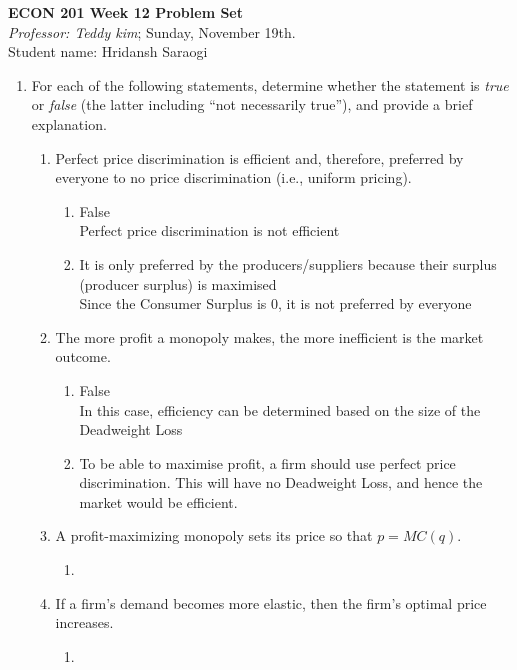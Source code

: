 \documentclass[11pt]{article}
\begin{document}
\begin{center}
\textbf{ECON 201 Week 12 Problem Set}\\
\textit {Professor: Teddy kim};  
Sunday, November 19th.
\\Student name: Hridansh Saraogi
\end{center}

\begin{enumerate}
\item For each of the following statements, determine whether
the statement is \emph{true} or \emph{false} (the latter including ``not necessarily true''), and provide a brief explanation.
    \begin{enumerate}
    \item Perfect price discrimination is efficient and, therefore, preferred by everyone to no price discrimination (i.e., uniform pricing).
    \begin{enumerate}
        \item False\\
        Perfect price discrimination is not efficient
        \item It is only preferred by the producers/suppliers because their surplus (producer surplus) is maximised\\Since the Consumer Surplus is 0, it is not preferred by everyone
    \end{enumerate}
	
	\item The more profit a monopoly makes, the more inefficient is the market outcome.
	\begin{enumerate}
        \item False\\
        In this case, efficiency can be determined based on the size of the Deadweight Loss
        \item To be able to maximise profit, a firm should use perfect price discrimination. This will have no Deadweight Loss, and hence the market would be efficient.
    \end{enumerate}
	

	\item A profit-maximizing monopoly sets its price so that $p=MC(q)$.
	\begin{enumerate}
        \item 
    \end{enumerate}
	
	
	\item If a firm's demand becomes more elastic, then the firm's optimal price increases.
	\begin{enumerate}
        \item 
    \end{enumerate}
	


\end{enumerate}
\end{enumerate}
\end{document}
